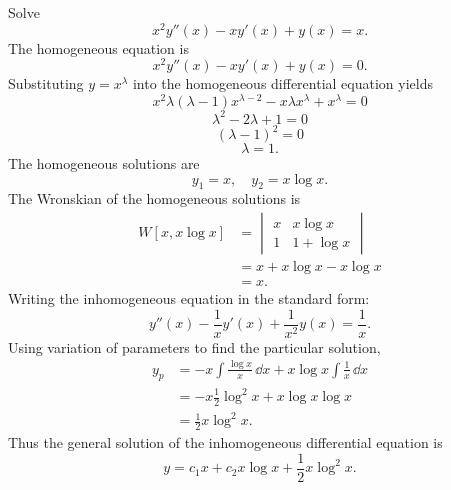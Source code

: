 {%
\begin{Solution}
  \label{solution x2y-xy+y=x}
  Solve
  \[
  x^2 y''(x) - x y'(x) + y(x) = x.
  \]
  The homogeneous equation is
  \[
  x^2 y''(x) - x y'(x) + y(x) = 0.
  \]
  Substituting $y = x^\lambda$ into the homogeneous differential equation
  yields
  \[
  x^2 \lambda(\lambda-1) x^{\lambda-2} - x \lambda x^\lambda + x^\lambda = 0
  \]
  \[
  \lambda^2 - 2 \lambda + 1 = 0
  \]
  \[
  (\lambda-1)^2 = 0
  \]
  \[
  \lambda = 1.
  \]
  The homogeneous solutions are
  \[
  y_1 = x, \quad y_2 = x \log x.
  \]
  The Wronskian of the homogeneous solutions is
  \begin{align*}
    W[x, x \log x]
    &= \begin{vmatrix}
      x & x \log x \\
      1 & 1 + \log x
    \end{vmatrix} \\
    &= x + x \log x - x \log x \\
    &= x.
  \end{align*}
  Writing the inhomogeneous equation in the standard form:
  \[
  y''(x) - \frac{1}{x} y'(x) + \frac{1}{x^2} y(x) = \frac{1}{x}.
  \]
  Using variation of parameters to find the particular solution,
  \begin{align*}
    y_p
    &= -x \int \frac{\log x}{x} \,\dd x
    + x \log x \int \frac{1}{x} \,\dd x \\
    &= -x \frac{1}{2} \log^2 x
    + x \log x \log x \\
    &= \frac{1}{2} x \log^2 x.
  \end{align*}
  Thus the general solution of the inhomogeneous differential equation is
  \[
  \boxed{
    y = c_1 x + c_2 x \log x + \frac{1}{2} x \log^2 x.
    }
  \]
\end{Solution}





}
